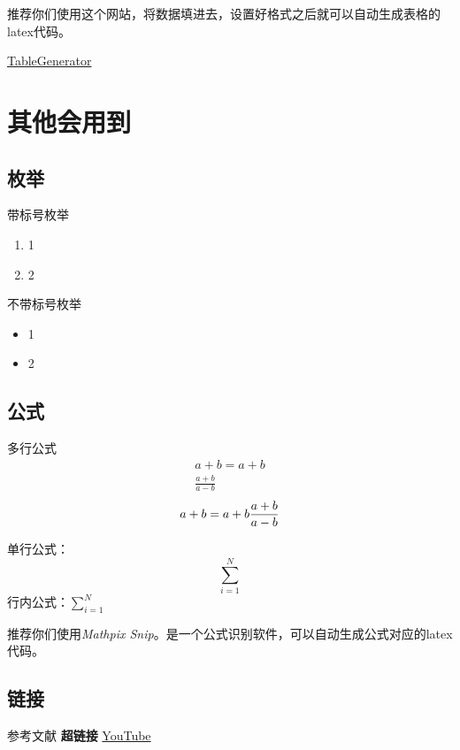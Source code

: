 \documentclass[a4paper]{article}
\begin{document}
推荐你们使用这个网站，将数据填进去，设置好格式之后就可以自动生成表格的latex代码。

\href{https://www.tablesgenerator.com/}{TableGenerator}

\section{其他会用到}
\subsection{枚举}
带标号枚举
\begin{enumerate}
  \item 1
  \item 2
\end{enumerate}

不带标号枚举
\begin{itemize}
  \item 1
  \item 2
\end{itemize}

\subsection{公式}

多行公式
\begin{align}
  a+b = a + b \\
  \frac{a+b}{a-b}
\end{align}
\begin{equation}
    a+b = a + b \\
  \frac{a+b}{a-b}
\end{equation}

单行公式：$$\sum^N_{i=1}$$
行内公式：$\sum^N_{i=1}$

推荐你们使用\textit{Mathpix Snip}。是一个公式识别软件，可以自动生成公式对应的latex代码。

\subsection{链接}
参考文献\cite{quinn1994parallel}\cite{golub2014scientific}\cite{joseph2022parallel}
\textbf{超链接}  \href{http://youtube.com/}{YouTube}

\newpage

 
\end{document}
